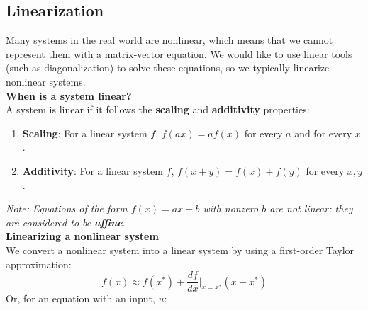 

\def\title{Worksheet 10}

\newcommand{\qitem}{\qpart\item}

\renewcommand{\labelenumi}{(\alph{enumi})} %
\renewcommand{\theenumi}{(\alph{enumi})} %
\renewcommand{\labelenumii}{\roman{enumii}.} %
\renewcommand{\theenumii}{\roman{enumii}.}
    \maketitle

    \vspace{0.5em}

    \subsection*{Linearization}
    Many systems in the real world are nonlinear, which means that we cannot represent them with a matrix-vector equation.
    We would like to use linear tools (such as diagonalization) to solve these equations, so we typically linearize nonlinear systems. \\
    \newline
    \textbf{When is a system linear?} \\
    \newline
    A system is linear if it follows the \textbf{scaling} and \textbf{additivity} properties:
    \begin{enumerate}
        \item \textbf{Scaling}: For a linear system $f$, $\boxed{f(ax) = af(x)}$ for every $a$ and for every $x$.
        \item \textbf{Additivity}: For a linear system $f$, $\boxed{f(x + y) = f(x) + f(y)}$ for every $x, y$.
    \end{enumerate}
    \textit{Note: Equations of the form $f(x) = ax + b$ with nonzero $b$ are not linear; they are considered to be \textbf{affine}}. \\
    \newline
    \textbf{Linearizing a nonlinear system} \\
    \newline
    We convert a nonlinear system into a linear system by using a first-order Taylor approximation:
    $$\boxed{f(x) \approx f(x^*) + \frac{df}{dx} \bigg\rvert_{x = x^*} (x - x^*)}$$
    Or, for an equation with an input, $u$:
